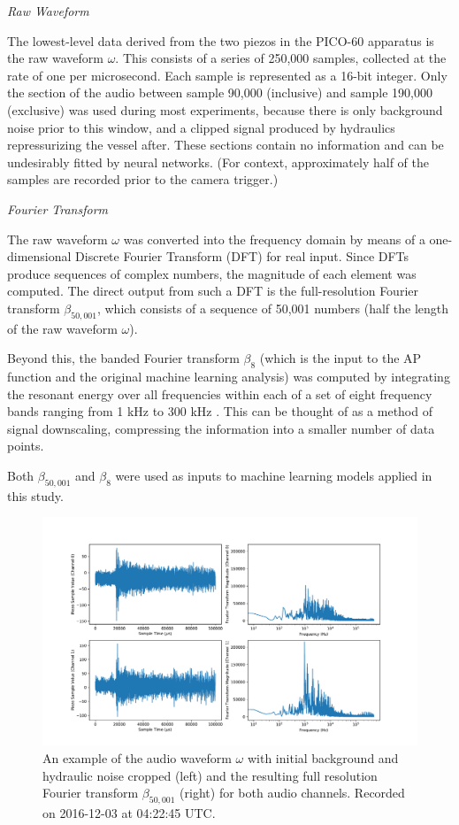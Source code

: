 \documentclass[10pt]{article}
\begin{document}
\textit{Raw Waveform}

The lowest-level data derived from the two piezos in the PICO-60 apparatus is the raw waveform $\omega$. This consists of a series of 250,000 samples, collected at the rate of one per microsecond. Each sample is represented as a 16-bit integer. Only the section of the audio between sample 90,000 (inclusive) and sample 190,000 (exclusive) was used during most experiments, because there is only background noise prior to this window, and a clipped signal produced by hydraulics repressurizing the vessel after. These sections contain no information and can be undesirably fitted by neural networks. (For context, approximately half of the samples are recorded prior to the camera trigger.)

\textit{Fourier Transform}

The raw waveform $\omega$ was converted into the frequency domain by means of a one-dimensional Discrete Fourier Transform (DFT) for real input. Since DFTs produce sequences of complex numbers, the magnitude of each element was computed. The direct output from such a DFT is the full-resolution Fourier transform $\beta _{50,001}$, which consists of a sequence of 50,001 numbers (half the length of the raw waveform $\omega$).

Beyond this, the banded Fourier transform $\beta_{8}$ (which is the input to the AP function and the original machine learning analysis) was computed by integrating the resonant energy over all frequencies within each of a set of eight frequency bands ranging from 1 kHz to 300 kHz \cite{pico}. This can be thought of as a method of signal downscaling, compressing the information into a smaller number of data points.

Both $\beta _{50,001}$ and $\beta_{8}$ were used as inputs to machine learning models applied in this study.

\begin{figure}[h]
    \centering
    \includegraphics[width=\textwidth]{audio}
    \caption{\label{} An example of the audio waveform $\omega$ with initial background and hydraulic noise cropped (left) and the resulting full resolution Fourier transform $\beta_{50,001}$ (right) for both audio channels. Recorded on 2016-12-03 at 04:22:45 UTC.}
\end{figure}
\end{document}
